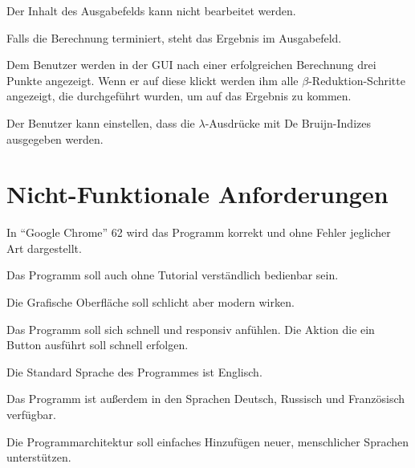 \documentclass[parskip=full,11pt,twoside]{scrartcl}
\begin{document}
Der Inhalt des Ausgabefelds kann nicht bearbeitet werden.

Falls die Berechnung terminiert, steht das Ergebnis im Ausgabefeld.

Dem Benutzer werden in der GUI nach einer erfolgreichen Berechnung drei Punkte angezeigt. Wenn er auf diese klickt werden ihm alle $\beta$-Reduktion-Schritte angezeigt, die durchgeführt wurden, um auf das Ergebnis zu kommen.

Der Benutzer kann einstellen, dass die $\lambda$-Ausdrücke mit De Bruijn-Indizes ausgegeben werden.














\newpage
\section{Nicht-Funktionale Anforderungen}


In \enquote{Google Chrome} 62 wird das Programm korrekt und ohne Fehler jeglicher Art dargestellt.

Das Programm soll auch ohne Tutorial verständlich bedienbar sein.

Die Grafische Oberfläche soll schlicht aber modern wirken.

Das Programm soll sich schnell und responsiv anfühlen. Die Aktion die ein Button ausführt soll schnell erfolgen.

Die Standard Sprache des Programmes ist Englisch.

Das Programm ist außerdem in den Sprachen Deutsch, Russisch und Französisch verfügbar.

Die Programmarchitektur soll einfaches Hinzufügen neuer, menschlicher Sprachen unterstützen.
\end{document}
